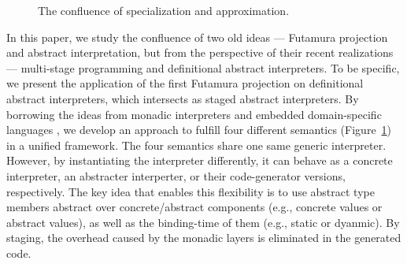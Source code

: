 \begin{figure}[h]
  \caption{The confluence of specialization and approximation.}
  \label{confluence}
\end{figure}

In this paper, we study the confluence of two old ideas --- Futamura projection
and abstract interpretation, but from the perspective of their recent
realizations --- multi-stage programming and definitional abstract interpreters.
To be specific, we present the application of the first Futamura projection on
definitional abstract interpreters, which intersects as staged abstract
interpreters. By borrowing the ideas from monadic interpreters
\cite{Steele:1994:BIC:174675.178068, DBLP:conf/popl/LiangHJ95,
DBLP:journals/pacmpl/DaraisLNH17, Sergey:2013:MAI:2491956.2491979} and embedded
domain-specific languages \cite{DBLP:conf/snapl/RompfBLSJAOSKDK15,
DBLP:journals/jfp/CaretteKS09, DBLP:conf/icfp/GibbonsW14}, we develop an
approach to fulfill four different semantics (Figure~\ref{confluence}) in a
unified framework. The four semantics share one same generic interpreter.
However, by instantiating the interpreter differently, it can behave as a
concrete interpreter, an abstracter interperter, or their code-generator
versions, respectively. The key idea that enables this flexibility is to use
abstract type members abstract over concrete/abstract components (e.g., concrete
values or abstract values), as well as the binding-time of them (e.g., static or
dyanmic). By staging, the overhead caused by the monadic layers is eliminated in
the generated code.

